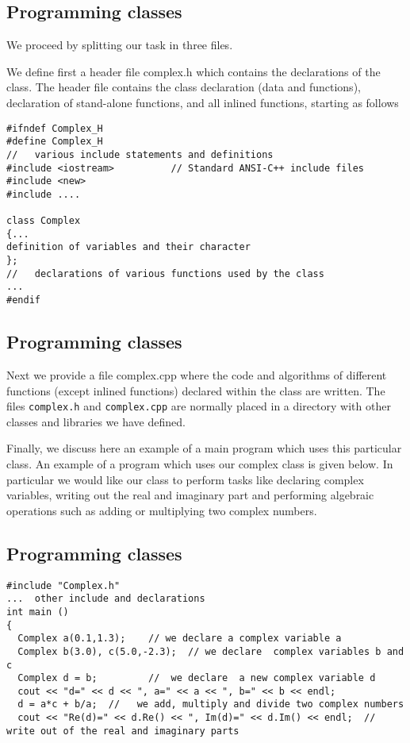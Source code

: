 \documentclass[%
oneside,                 %
final,                   %
10pt]{article}
\begin{document}
\subsection*{Programming classes}

We proceed by  splitting our task in three files.

We define first a header file complex.h  which contains the declarations of
the class. The header file contains the class declaration (data and
functions), declaration of stand-alone functions, and all inlined
functions, starting as follows

\begin{verbatim}
#ifndef Complex_H
#define Complex_H
//   various include statements and definitions
#include <iostream>          // Standard ANSI-C++ include files
#include <new>
#include ....

class Complex
{...
definition of variables and their character
};
//   declarations of various functions used by the class
...
#endif
\end{verbatim}

\subsection*{Programming classes}

Next we provide a file complex.cpp where the code and algorithms of
different functions (except inlined functions) declared within the
class are written.  The files \Verb!complex.h! and \Verb!complex.cpp! are normally
placed in a directory with other classes and libraries we have
defined.

Finally, we discuss here an example of a main program which uses this
particular class.  An example of a program which uses our complex
class is given below. In particular we would like our class to perform
tasks like declaring complex variables, writing out the real and
imaginary part and performing algebraic operations such as adding or
multiplying two complex numbers.

\subsection*{Programming classes}

\begin{verbatim}
#include "Complex.h"
...  other include and declarations
int main ()
{
  Complex a(0.1,1.3);    // we declare a complex variable a
  Complex b(3.0), c(5.0,-2.3);  // we declare  complex variables b and c
  Complex d = b;         //  we declare  a new complex variable d
  cout << "d=" << d << ", a=" << a << ", b=" << b << endl;
  d = a*c + b/a;  //   we add, multiply and divide two complex numbers
  cout << "Re(d)=" << d.Re() << ", Im(d)=" << d.Im() << endl;  // write out of the real and imaginary parts

\end{verbatim}
\end{document}
